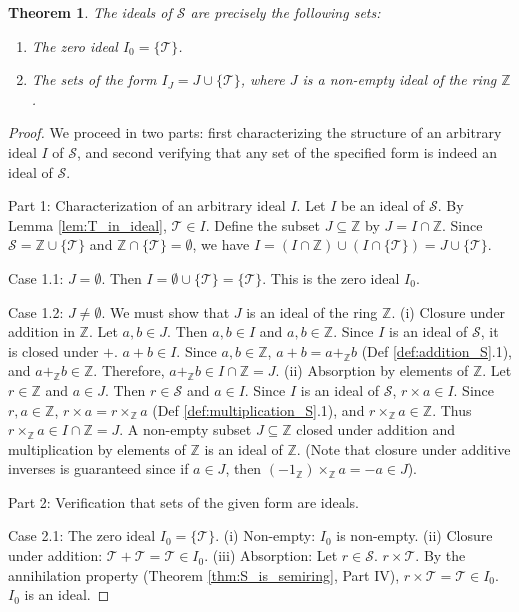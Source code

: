 \documentclass[11pt, a4paper]{article}
\theoremstyle{plain}
\newtheorem{theorem}{Theorem}[section]
\theoremstyle{definition}
\numberwithin{equation}{section}
\newcommand{\Z}{\mathbb{Z}}
\newcommand{\Tobj}{\mathcal{T}} %
\newcommand{\SemiringS}{\mathcal{S}}
\begin{document}
\begin{theorem}\label{thm:ideal_structure_S}
The ideals of $\SemiringS$ are precisely the following sets:
\begin{enumerate}
    \item The zero ideal $I_0 = \{\Tobj\}$.
    \item The sets of the form $I_J = J \cup \{\Tobj\}$, where $J$ is a non-empty ideal of the ring $\Z$.
\end{enumerate}
\end{theorem}
\begin{proof}
We proceed in two parts: first characterizing the structure of an arbitrary ideal $I$ of $\SemiringS$, and second verifying that any set of the specified form is indeed an ideal of $\SemiringS$.

Part 1: Characterization of an arbitrary ideal $I$.
Let $I$ be an ideal of $\SemiringS$. By Lemma \ref{lem:T_in_ideal}, $\Tobj \in I$.
Define the subset $J \subseteq \Z$ by $J = I \cap \Z$.
Since $\SemiringS = \Z \cup \{\Tobj\}$ and $\Z \cap \{\Tobj\} = \emptyset$, we have $I = (I \cap \Z) \cup (I \cap \{\Tobj\}) = J \cup \{\Tobj\}$.

Case 1.1: $J = \emptyset$. Then $I = \emptyset \cup \{\Tobj\} = \{\Tobj\}$. This is the zero ideal $I_0$.

Case 1.2: $J \neq \emptyset$. We must show that $J$ is an ideal of the ring $\Z$.
(i) Closure under addition in $\Z$. Let $a, b \in J$. Then $a, b \in I$ and $a, b \in \Z$. Since $I$ is an ideal of $\SemiringS$, it is closed under $+$. $a+b \in I$. Since $a, b \in \Z$, $a+b = a+_{\Z} b$ (Def \ref{def:addition_S}.1), and $a+_{\Z} b \in \Z$. Therefore, $a+_{\Z} b \in I \cap \Z = J$.
(ii) Absorption by elements of $\Z$. Let $r \in \Z$ and $a \in J$. Then $r \in \SemiringS$ and $a \in I$. Since $I$ is an ideal of $\SemiringS$, $r\times a \in I$. Since $r, a \in \Z$, $r\times a = r\times_{\Z} a$ (Def \ref{def:multiplication_S}.1), and $r\times_{\Z} a \in \Z$. Thus $r\times_{\Z} a \in I \cap \Z = J$.
A non-empty subset $J \subseteq \Z$ closed under addition and multiplication by elements of $\Z$ is an ideal of $\Z$. (Note that closure under additive inverses is guaranteed since if $a \in J$, then $(-1_{\Z})\times_{\Z} a = -a \in J$).

Part 2: Verification that sets of the given form are ideals.

Case 2.1: The zero ideal $I_0=\{\Tobj\}$.
(i) Non-empty: $I_0$ is non-empty.
(ii) Closure under addition: $\Tobj+\Tobj=\Tobj \in I_0$.
(iii) Absorption: Let $r \in \SemiringS$. $r\times\Tobj$. By the annihilation property (Theorem \ref{thm:S_is_semiring}, Part IV), $r\times\Tobj = \Tobj \in I_0$.
$I_0$ is an ideal.


\end{proof}
\end{document}
